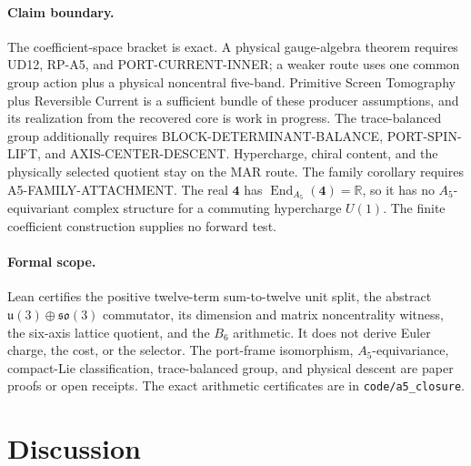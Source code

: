 \documentclass[11pt]{article}
\begin{document}
\paragraph{Claim boundary.} The coefficient-space bracket is exact. A physical
gauge-algebra theorem requires \textsc{UD12}, \textsc{RP-A5}, and
\textsc{PORT-CURRENT-INNER}; a weaker route uses one common group action plus a
physical noncentral five-band. Primitive Screen Tomography plus Reversible
Current is a sufficient bundle of these producer assumptions, and its
realization from the recovered core is work in progress. The trace-balanced
group additionally requires \textsc{BLOCK-DETERMINANT-BALANCE},
\textsc{PORT-SPIN-LIFT}, and \textsc{AXIS-CENTER-DESCENT}. Hypercharge, chiral
content, and the physically selected quotient stay on the MAR route. The
family corollary requires \textsc{A5-FAMILY-ATTACHMENT}. The real
\(\mathbf4\) has \(\operatorname{End}_{A_5}(\mathbf4)=\mathbb R\), so it has no
\(A_5\)-equivariant complex structure for a commuting hypercharge \(U(1)\).
The finite coefficient construction supplies no forward test.

\paragraph{Formal scope.} Lean certifies the positive twelve-term
sum-to-twelve unit split, the abstract
\(\mathfrak u(3)\oplus\mathfrak{so}(3)\) commutator, its dimension and matrix
noncentrality witness, the six-axis lattice quotient, and the \(B_6\)
arithmetic. It does not derive Euler charge, the cost, or the selector. The
port-frame isomorphism, \(A_5\)-equivariance, compact-Lie
classification, trace-balanced group, and physical descent are paper proofs or
open receipts. The exact arithmetic certificates are in
\texttt{code/a5\_closure}.

\section{Discussion}
\end{document}
